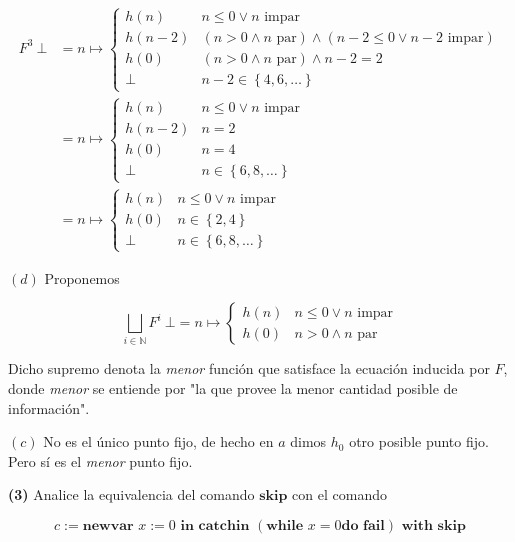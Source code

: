 \documentclass[a4paper, 12pt]{article}
\begin{document}
\begin{align*}
  F^3 ~ \bot 
  &= n\mapsto \begin{cases}
    h(n) & n \leq 0 \lor  n \text{ impar} \\ 
    h(n-2) & (n > 0 \land  n \text{ par}) \land (n-2 \leq 0 \lor  n- 2
    \text{ impar}) \\ 
    h(0) & (n>0 \land n \text{ par}) \land n -2 = 2 \\ 
    \bot & n-2 \in \left\{ 4, 6, \ldots \right\} 
  \end{cases} \\ 
  &=n\mapsto \begin{cases}
    h(n) & n \leq 0 \lor  n \text{ impar} \\ 
    h(n-2) & n = 2 \\ 
    h(0) & n = 4 \\ 
    \bot & n \in \left\{ 6, 8, \ldots \right\} 
  \end{cases} \\ 
  &=n\mapsto \begin{cases}
    h(n) & n \leq 0 \lor n \text{ impar}\\ 
    h(0) & n \in \left\{ 2, 4 \right\}  \\ 
    \bot & n \in \left\{ 6, 8, \ldots \right\} 
  \end{cases}
\end{align*}

$(d)$ Proponemos 

\begin{equation*}
  \bigsqcup_{i \in \mathbb{N}} F^i ~ \bot = n \mapsto \begin{cases}
    h(n) & n \leq 0 \lor  n \text{ impar} \\ 
    h(0) & n > 0 \land n \text{ par}
  \end{cases}
\end{equation*}

Dicho supremo denota la \textit{menor} función que satisface la ecuación
inducida por $F$, donde \textit{menor} se entiende por "la que provee la menor
cantidad posible de información".

$(c)$ No es el único punto fijo, de hecho en $a$ dimos $h_0$ otro posible punto
fijo. Pero sí es el \textit{menor} punto fijo.

\pagebreak 

\begin{myframe}
  \textbf{(3)} Analice la equivalencia del comando $\textbf{skip}$ con el
  comando 

  \begin{equation*}
    c := \textbf{newvar } x:= 0 \textbf{ in catchin } (\textbf{while } x = 0 \textbf{
    do } \textbf{fail}) \textbf{ with skip}
  \end{equation*}
\end{myframe}
\end{document}
